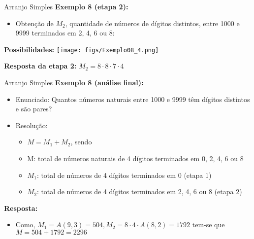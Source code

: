 \documentclass[aspectratio=169]{beamer}
\begin{document}
\begin{frame}{Arranjo Simples}
    \textbf{Exemplo 8 (etapa 2):}

    \begin{itemize}
        \item[] Obtenção de $M_2$, quantidade de números de dígitos distintos, entre 1000 e 9999 terminados em 2, 4, 6 ou 8:
    \end{itemize}

    \vspace{2mm}
    
    \pause
    \textbf{Possibilidades:} \hspace{2cm} \texttt{[image: figs/Exemplo08\_4.png]}
    
   \pause

   \vspace{4mm}

   \textbf{Resposta da etapa 2:} $M_2 = 8 \cdot 8 \cdot 7 \cdot 4$

\end{frame}

\begin{frame}{Arranjo Simples}
    \textbf{Exemplo 8 (análise final):}

    \begin{itemize}
        \item[] Enunciado: Quantos números naturais entre 1000 e 9999 têm dígitos distintos e são pares?
        \item[] Resolução:
        \begin{itemize}
            \item $M = M_1 + M_2$, sendo
            \item M: total de números naturais de 4 dígitos terminados em 0, 2, 4, 6 ou 8
            \item $M_1$: total de números de 4 dígitos terminados em 0 (etapa 1)
            \item $M_2$: total de números de 4 dígitos terminados em 2, 4, 6 ou 8 (etapa 2)
        \end{itemize}
    \end{itemize}

    \pause
    \textbf{Resposta:} 
    
    \begin{itemize}
        \item Como, $M_1 = A(9,3) = 504, M_2 = 8 \cdot 4 \cdot A(8,2) = 1792$ tem-se que $M = 504 + 1792 = 2296$
    \end{itemize}
    

\end{frame}
\end{document}

